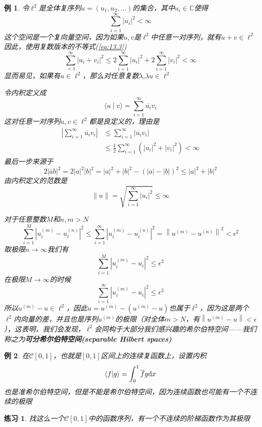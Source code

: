 \documentclass[hyperref,UTF8]{ctexbook}
\newtheorem{eg}{例}[chapter]
\newtheorem*{exercise}{练习}
\begin{document}
\begin{eg}
    令\(\ell^2\)是全体复序列\(u=(u_1,u_2,...)\)的集合，其中\(u_i \in \mathbb{C}\)使得
    $$
\sum_{i=1}^{\infty}\left|u_{i}\right|^{2}<\infty
$$
这个空间是一个复向量空间，因为如果\(u,v\)是\(\ell^2\)中任意一对序列，就有\(u+v \in \ell^2\)\\
因此，使用复数版本的不等式(\ref{eq:13.3})
$$
\sum_{=1}^{\infty}\left|u_{i}+v_{i}\right|^{2} \leq 2 \sum_{i=1}^{\infty}\left|u_{i}\right|^{2}+2 \sum_{i=1}^{\infty}\left|v_{i}\right|^{2}<\infty
$$
显而易见，如果有\(u \in \ell^2\)，那么对任意复数\(\lambda\),\(\lambda u \in \ell^2\)

令内积定义成
$$
\langle u \mid v\rangle=\sum_{i=1}^{\infty} \overline{u_{i}} v_{i}
$$
这对任意一对序列\(u,v\in \ell^2\)都是良定义的，理由是
$$
\begin{aligned}
\left|\sum_{i=1}^{\infty} \overline{u_{i}} v_{i}\right| & \leq \sum_{i=1}^{\infty}\left|\overline{u_{i}} v_{i}\right| \\
& \leq \frac{1}{2} \sum_{i=1}^{\infty}\left(\left|u_{i}\right|^{2}+\left|v_{i}\right|^{2}\right)<\infty
\end{aligned}
$$
最后一步来源于
$$
2|\bar{a} b|^{2}=2|a|^{2}|b|^{2}=|a|^{2}+|b|^{2}-(|a|-|b|)^{2} \leq|a|^{2}+|b|^{2}
$$
由内积定义的范数是
$$
\|u\|=\sqrt{\sum_{i=1}^{\infty}\left|u_{i}\right|^{2}} \leq \infty
$$

对于任意整数\(M\)和\(n,m>N\)
$$
\sum_{i=1}^{M}\left|u_{i}^{(m)}-u_{i}^{(n)}\right|^{2} \leq \sum_{i=1}^{\infty}\left|u_{i}^{(m)}-u_{i}^{(n)}\right|^{2}=\left\|u^{(m)}-u^{(n)}\right\|^{2}<\epsilon^{2}
$$
取极限\(n\rightarrow\infty\)我们有
$$
\sum_{i=1}^{M}\left|u_{i}^{(m)}-u_{i}\right|^{2} \leq \epsilon^{2}
$$
在极限\(M\rightarrow\infty\)的时候
$$
\sum_{i=1}^{\infty}\left|u_{i}^{(m)}-u_{i}\right|^{2} \leq \epsilon^{2}
$$
所以\(u^{(m)}-u\in \ell^2\)，因此\(u=u^{(m)}-(u^{(m)}-u)\)也属于\(\ell^2\)，因为这是两个\(\ell^2\)内向量的差，并且也是序列\(u^{(m)}\)的极限（对全体\(m>N\)，有\(\left\lVert u^{(m)}-u\right\rVert <\epsilon\)），这表明，我们会发现，\(\ell^2\)会同构于大部分我们感兴趣的希尔伯特空间——我们称之为\textbf{可分希尔伯特空间(separable Hilbert spaces)}
\end{eg}
\begin{eg}
    在\(\mathcal{C}[0,1]\)，也就是\([0,1]\)区间上的连续复函数上，设置内积
    \[\braket{f|g}=\int_0^1 \overline{f}g \mathrm{d}x\]
    也是准希尔伯特空间，但是不能是希尔伯特空间，因为连续函数也可能有一个不连续的极限
\end{eg}
\begin{exercise}
    找这么一个\(\mathcal{C}[0,1]\)中的函数序列，有一个不连续的阶梯函数作为其极限
\end{exercise}
\end{document}
